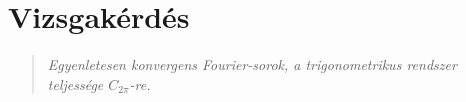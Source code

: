 \newpage
\section{Vizsgakérdés}
\begin{quote}
	\textit{Egyenletesen konvergens Fourier-sorok, a trigonometrikus rendszer teljessége $C_{2\pi}$-re.}
\end{quote}